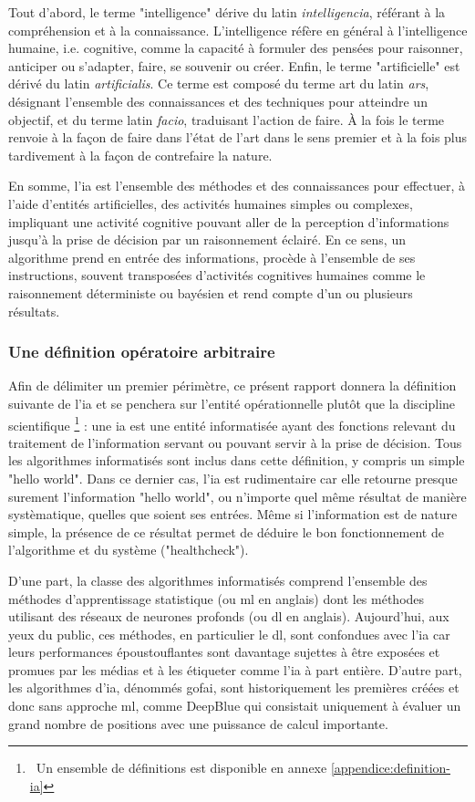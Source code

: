 Tout d'abord, le terme "intelligence" dérive du latin \textit{intelligencia}, référant à la compréhension et à la connaissance. L'intelligence réfère en général à l'intelligence humaine, i.e. cognitive, comme la capacité à formuler des pensées pour raisonner, anticiper ou s'adapter, faire, se souvenir ou créer.
Enfin, le terme "artificielle" est dérivé du latin \textit{artificialis}. Ce terme est composé du terme art du latin \textit{ars}, désignant l'ensemble des connaissances et des techniques pour atteindre un objectif, et du terme latin \textit{facio}, traduisant l'action de faire. À la fois le terme renvoie à la façon de faire dans l'état de l'art dans le sens premier et à la fois plus tardivement à la façon de contrefaire la nature.

En somme, l'\gls{ia} est l'ensemble des méthodes et des connaissances pour effectuer, à l'aide d'entités artificielles, des activités humaines simples ou complexes, impliquant une activité cognitive pouvant aller de la perception d'informations jusqu'à la prise de décision par un raisonnement éclairé. En ce sens, un algorithme prend en entrée des informations, procède à l'ensemble de ses instructions, souvent transposées d'activités cognitives humaines comme le raisonnement déterministe ou bayésien et rend compte d'un ou plusieurs résultats.

\subsubsection{Une définition opératoire arbitraire}
Afin de délimiter un premier périmètre, ce présent rapport donnera la définition suivante de l'\gls{ia} et se penchera sur l'entité opérationnelle plutôt que la discipline scientifique \footnote{~Un ensemble de définitions est disponible en annexe \ref{appendice:definition-ia}} : une \gls{ia} est une entité informatisée ayant des fonctions relevant du traitement de l'information servant ou pouvant servir à la prise de décision. Tous les algorithmes informatisés sont inclus dans cette définition, y compris un simple "hello world". Dans ce dernier cas, l'\gls{ia} est rudimentaire car elle retourne presque surement l'information "hello world", ou n'importe quel même résultat de manière systèmatique, quelles que soient ses entrées. Même si l'information est de nature simple, la présence de ce résultat permet de déduire le bon fonctionnement de l'algorithme et du système ("healthcheck").

D'une part, la classe des algorithmes informatisés comprend l'ensemble des méthodes d'apprentissage statistique (ou \gls{ml} en anglais) dont les méthodes utilisant des réseaux de neurones profonds (ou \gls{dl} en anglais). Aujourd'hui, aux yeux du public, ces méthodes, en particulier le \gls{dl}, sont confondues avec l'\gls{ia} car leurs performances époustouflantes sont davantage sujettes à être exposées et promues par les médias et à les étiqueter comme l'\gls{ia} à part entière. D'autre part, les algorithmes d'\gls{ia}, dénommés \gls{gofai}, sont historiquement les premières créées et donc sans approche \gls{ml}, comme DeepBlue qui consistait uniquement à évaluer un grand nombre de positions avec une puissance de calcul importante.

